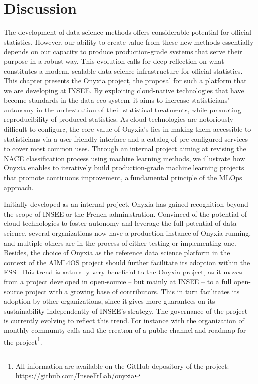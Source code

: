 \documentclass[graybox]{svmult}
\begin{document}
\section{Discussion}

The development of data science methods offers considerable potential for official statistics. However, our ability to create value from these new methods essentially depends on our capacity to produce production-grade systems that serve their purpose in a robust way. This evolution calls for deep reflection on what constitutes a modern, scalable data science infrastructure for official statistics. This chapter presents the Onyxia project, the proposal for such a platform that we are developing at INSEE. By exploiting cloud-native technologies that have become standards in the data eco-system, it aims to increase statisticians' autonomy in the orchestration of their statistical treatments, while promoting reproducibility of produced statistics. As cloud technologies are notoriously difficult to configure, the core value of Onyxia's lies in making them accessible to statisticians via a user-friendly interface and a catalog of pre-configured services to cover most common uses. Through an internal project aiming at revising the NACE classification process using machine learning methods, we illustrate how Onyxia enables to iteratively build production-grade machine learning projects that promote continuous improvement, a fundamental principle of the MLOps approach.

Initially developed as an internal project, Onyxia has gained recognition beyond the scope of INSEE or the French administration. Convinced of the potential of cloud technologies to foster autonomy and leverage the full potential of data science, several organizations now have a production instance of Onyxia running, and multiple others are in the process of either testing or implementing one. Besides, the choice of Onyxia as the reference data science platform in the context of the AIML4OS project should further facilitate its adoption within the ESS. This trend is naturally very beneficial to the Onyxia project, as it moves from a project developed in open-source -- but mainly at INSEE -- to a full open-source project with a growing base of contributors. This in turn facilitates its adoption by other organizations, since it gives more guarantees on its sustainability independently of INSEE's strategy. The governance of the project is currently evolving to reflect this trend. For instance with the organization of monthly community calls and the creation of a public channel and roadmap for the project\footnote{All information are available on the GitHub depository of the project: \url{https://github.com/InseeFrLab/onyxia}}.
\end{document}
